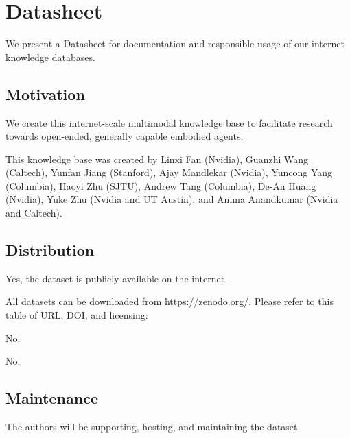 \section{Datasheet}

We present a Datasheet \cite{datasheet21gebru} for documentation and responsible usage of our internet knowledge databases.

\subsection{Motivation}

 We create this internet-scale multimodal knowledge base to facilitate research towards open-ended, generally capable embodied agents.

 This knowledge base was created by Linxi Fan (Nvidia), Guanzhi Wang (Caltech), Yunfan Jiang (Stanford), Ajay Mandlekar (Nvidia), Yuncong Yang (Columbia), Haoyi Zhu (SJTU), Andrew Tang (Columbia), De-An Huang (Nvidia), Yuke Zhu (Nvidia and UT Austin), and Anima Anandkumar (Nvidia and Caltech).

\subsection{Distribution}
 Yes, the dataset is publicly available on the internet.

All datasets can be downloaded from \url{https://zenodo.org/}. Please refer to this table of URL, DOI, and licensing: 



 No.

 No.

\subsection{Maintenance}
 The authors will be supporting, hosting, and maintaining the dataset. 

